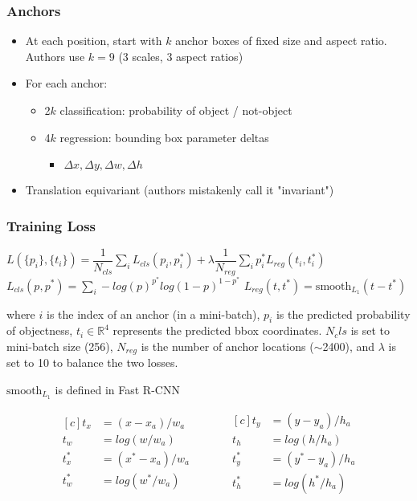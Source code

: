 \subsubsection*{Anchors}
\begin{itemize}
\item At each position, start with $k$ anchor boxes of fixed size and aspect ratio. Authors use $k=9$ (3 scales, 3 aspect ratios)
\item For each anchor:
	\begin{itemize}
	\item 2$k$ classification: probability of object / not-object
	\item 4$k$ regression: bounding box parameter deltas
		\begin{itemize}
		\item $\Delta x, \Delta y, \Delta w, \Delta h$
		\end{itemize}
	\end{itemize}
	
\item Translation equivariant (authors mistakenly call it "invariant")
\end{itemize}


\subsubsection*{Training Loss}
\begin{center}
$L(\{p_i\}, \{t_i\}) = \dfrac{1}{N_{cls}}\sum\limits_{i}L_{cls}(p_i, p_i^*) + \lambda \dfrac{1}{N_{reg}}\sum\limits_{i}p_i^*L_{reg}(t_i, t_i^*)$\\[5mm]
$L_{cls}(p, p^*) = \sum\limits_{i}-log(p)^{p^*}log(1-p)^{1-p^*}$ \hspace{2em} $L_{reg}(t,t^*) = \text{smooth}_{L_1}(t - t^*)$
\end{center}

where $i$ is the index of an anchor (in a mini-batch), $p_i$ is the predicted probability of objectness, $t_i \in \mathbb{R}^4$ represents the predicted bbox coordinates. $N_cls$ is set to mini-batch size (256), $N_{reg}$ is the number of anchor locations ($\sim$2400), and $\lambda$ is set to 10 to balance the two losses.

$\text{smooth}_{L_1}$ is defined in Fast R-CNN 

\begin{equation*}
\begin{aligned}[c]
t_x &= (x - x_a) / w_a\\
t_w &= log(w / w_a)\\
t_x^* &= (x^* - x_a) / w_a\\
t_w^* &= log(w^* / w_a)
\end{aligned}
\hspace{3em}
\begin{aligned}[c]
t_y &= (y - y_a) / h_a\\
t_h &= log(h / h_a)\\
t_y^* &= (y^* - y_a) / h_a\\
t_h^* &= log(h^* / h_a)
\end{aligned}
\end{equation*}

